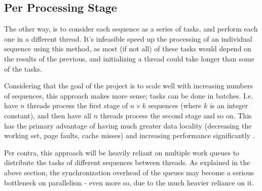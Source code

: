 \documentclass[a4paper,12pt]{report}
\begin{document}
\subsection{Per Processing Stage}

The other way, is to consider each sequence as a series of tasks, and perform each one in a different thread. It's infeasible speed up the processing of an individual sequence using this method, as most (if not all) of these tasks would depend on the results of the previous, and initializing a thread could take longer than some of the tasks.

Considering that the goal of the project is to scale well with increasing numbers of sequences, this approach makes more sense; tasks can be done in batches. I.e. have $n$ threads process the first stage of $n\times k$ sequences (where $k$ is an integer constant), and then have all $n$ threads process the second stage and so on. This has the primary advantage of having much greater data locality (decreasing the working set, page faults, cache misses) and increasing performance significantly \autocite{locality}.

Per contra, this approach will be heavily reliant on multiple work queues to distribute the tasks of different sequences between threads. As explained in the above section, the synchronization overhead of the queues may become a serious bottleneck on parallelism - even more so, due to the much heavier reliance on it.


\printbibliography
\end{document}
